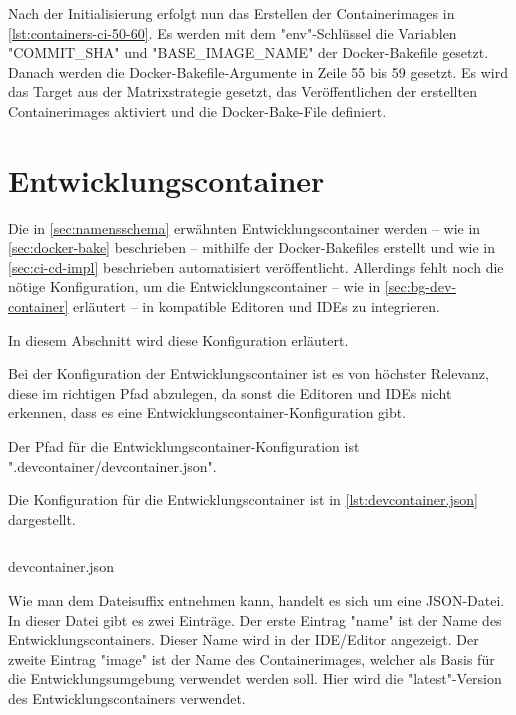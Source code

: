 Nach der Initialisierung erfolgt nun das Erstellen der Containerimages in \cref{lst:containers-ci-50-60}. Es werden mit dem "env"-Schlüssel die Variablen "COMMIT\_SHA" und "BASE\_IMAGE\_NAME" der Docker-Bakefile gesetzt. Danach werden die Docker-Bakefile-Argumente in Zeile 55 bis 59 gesetzt. Es wird das Target aus der Matrixstrategie gesetzt, das Veröffentlichen der erstellten Containerimages aktiviert und die Docker-Bake-File definiert.

\section{Entwicklungscontainer}

Die in \cref{sec:namensschema} erwähnten Entwicklungscontainer werden – wie in \cref{sec:docker-bake} beschrieben – mithilfe der Docker-Bakefiles erstellt und wie in \cref{sec:ci-cd-impl} beschrieben automatisiert veröffentlicht. Allerdings fehlt noch die nötige Konfiguration, um die Entwicklungscontainer – wie in \cref{sec:bg-dev-container} erläutert – in kompatible Editoren und IDEs zu integrieren. 

In diesem Abschnitt wird diese Konfiguration erläutert.

Bei der Konfiguration der Entwicklungscontainer ist es von höchster Relevanz, diese im richtigen Pfad abzulegen, da sonst die Editoren und IDEs nicht erkennen, dass es eine Entwicklungscontainer-Konfiguration gibt. 

Der Pfad für die Entwicklungscontainer-Konfiguration ist ".devcontainer/devcontainer.json".

Die Konfiguration für die Entwicklungscontainer ist in \cref{lst:devcontainer.json} dargestellt.

\begin{listing}[H]
    \inputminted{json}{./code-examples/devcontainer.json}
    \caption{devcontainer.json}
    \label{lst:devcontainer.json}
\end{listing}

Wie man dem Dateisuffix entnehmen kann, handelt es sich um eine JSON-Datei. In dieser Datei gibt es zwei Einträge. Der erste Eintrag "name" ist der Name des Entwicklungscontainers. Dieser Name wird in der IDE/Editor angezeigt. Der zweite Eintrag "image" ist der Name des Containerimages, welcher als Basis für die Entwicklungsumgebung verwendet werden soll. Hier wird die "latest"-Version des Entwicklungscontainers verwendet. 
